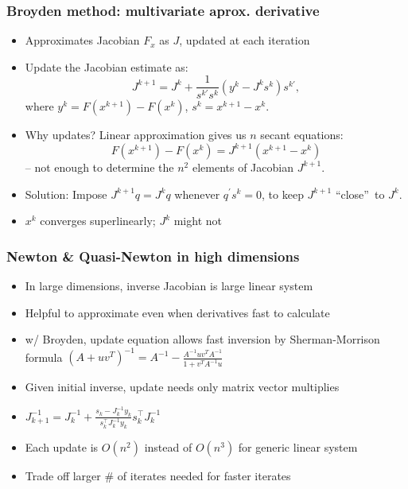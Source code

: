 \documentclass[bigger]{beamer}
\begin{document}
\begin{frame}%

\frametitle{Broyden method: multivariate aprox. derivative}

\begin{itemize}
\item Approximates Jacobian $F_{x}$ as $J$, updated at each iteration

\item Update the Jacobian estimate as: 
\begin{equation*}
J^{k+1}=J^{k}+\frac{1}{s^{k\prime }s^{k}}(y^{k}-J^{k}s^{k})s^{k\prime },
\end{equation*}%
where $y^{k}=F(x^{k+1})-F(x^{k})$, $s^{k}=x^{k+1}-x^{k}$.

\item Why updates? Linear approximation gives us $n$ secant equations:%
\begin{equation*}
F(x^{k+1})-F(x^{k})=J^{k+1}(x^{k+1}-x^{k})
\end{equation*}%
-- not enough to determine the $n^{2}$ elements of Jacobian $J^{k+1}$.

\item Solution: Impose $J^{k+1}q=J^{k}q$ whenever $q^{\prime }s^{k}=0$, 
\newline
to keep $J^{k+1}$ \textquotedblleft close\textquotedblright\ to $J^{k}$.

\item $x^{k}$ converges superlinearly; $J^{k}$ might not
\end{itemize}


\end{frame}%

\begin{frame}%
\frametitle{Newton \& Quasi-Newton in high dimensions}

\begin{itemize}

\item In large dimensions, inverse Jacobian is large linear system
\item Helpful to approximate even when derivatives fast to calculate
\item w/ Broyden, update equation allows fast inversion by Sherman-Morrison formula $(A +uv^{T})^{-1}=A^{-1}-\frac{A^{-1}uv^{T}A^{-1}}{1+v^{T}A^{-1}u}$
\item Given initial inverse, update needs only matrix vector multiplies
\item  $J_{k+1}^{-1}=J_{k}^{-1}+\frac{s_k-J^{-1}_k y_k}{s_k^{\top}J^{-1}_k y_k}s_k^{\top}J_{k}^{-1}$
\item Each update is $O(n^2)$ instead of $O(n^3)$ for generic linear system
\item Trade off larger $\#$ of iterates needed for faster iterates

\end{itemize}

\end{frame}%
\end{document}

